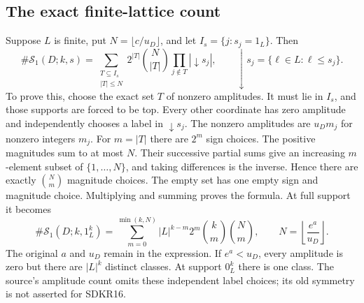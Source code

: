 \subsection{The exact finite-lattice count}
Suppose $L$ is finite, put $N=\lfloor c/u_D\rfloor$, and let
$I_s=\{j:s_j=1_L\}$. Then
\begin{equation}\tag{SDKR15}
\#\mathcal S_1(D;k,s)=
\sum_{\substack{T\subseteq I_s\\ |T|\le N}}
 2^{|T|}\binom N{|T|}\prod_{j\notin T}|\downarrow s_j|,
\qquad
\downarrow s_j=\{\ell\in L:\ell\le s_j\}.
\end{equation}
To prove this, choose the exact set $T$ of nonzero amplitudes.
It must lie in $I_s$, and those supports are forced to be top.
Every other coordinate has zero amplitude and independently
chooses a label in $\downarrow s_j$. The nonzero amplitudes
are $u_Dm_j$ for nonzero integers $m_j$. For $m=|T|$
there are $2^m$ sign choices. The positive magnitudes sum to
at most $N$. Their successive partial sums give an increasing
$m$-element subset of $\{1,\ldots,N\}$, and taking differences
is the inverse. Hence there are exactly $\binom Nm$ magnitude
choices. The empty set has one empty sign and magnitude choice.
Multiplying and summing proves the formula.
At full support it becomes
\begin{equation}\tag{SDKR16}
\#\mathcal S_1(D;k,1_L^k)
=\sum_{m=0}^{\min(k,N)}
 |L|^{k-m}2^m\binom km\binom Nm,
\qquad N=\left\lfloor\frac{e^a}{u_D}\right\rfloor .
\end{equation}
The original $a$ and $u_D$ remain in the expression.
If $e^a<u_D$, every amplitude is zero but there are $|L|^k$
distinct classes. At support $0_L^k$ there is one class.
The source's amplitude count omits these independent label
choices; its old symmetry is not asserted for SDKR16.
